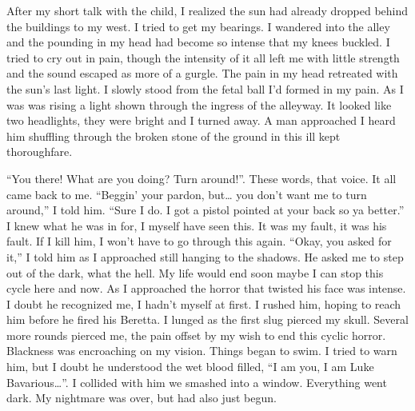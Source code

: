 After my short talk with the child, I realized the sun had already
dropped behind the buildings to my west. I tried to get my
bearings. I wandered into the alley and the pounding in my head had
become so intense that my knees buckled. I tried to cry out in
pain, though the intensity of it all left me with little strength
and the sound escaped as more of a gurgle. The pain in my head
retreated with the sun's last light. I slowly stood from the fetal
ball I'd formed in my pain. As I was was rising a light shown
through the ingress of the alleyway. It looked like two headlights,
they were bright and I turned away. A man approached I heard him
shuffling through the broken stone of the ground in this ill kept
thoroughfare.



``You there! What are you doing? Turn around!''. These words, that
voice. It all came back to me. ``Beggin' your pardon, but{\ldots} you
don't want me to turn around,'' I told him. ``Sure I do. I got a
pistol pointed at your back so ya better.'' I knew what he was in
for, I myself have seen this. It was my fault, it was his fault. If
I kill him, I won't have to go through this again. ``Okay, you asked
for it,'' I told him as I approached still hanging to the shadows.
He asked me to step out of the dark, what the hell. My life would
end soon maybe I can stop this cycle here and now. As I approached
the horror that twisted his face was intense. I doubt he recognized
me, I hadn't myself at first. I rushed him, hoping to reach him
before he fired his Beretta. I lunged as the first slug pierced my
skull. Several more rounds pierced me, the pain offset by my wish
to end this cyclic horror. Blackness was encroaching on my vision.
Things began to swim. I tried to warn him, but I doubt he
understood the wet blood filled, ``I am you, I am Luke
Bavarious{\ldots}''. I collided with him we smashed into a window.
Everything went dark. My nightmare was over, but had also just
begun. 
 







